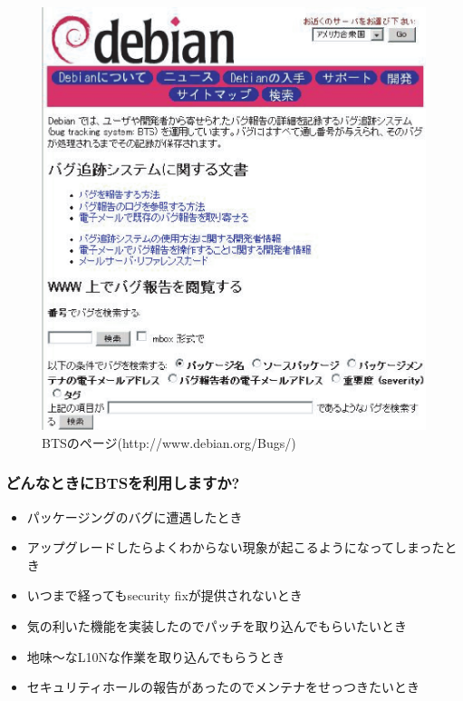 \documentclass[mingoth,a4paper]{jsarticle}
\begin{document}
\begin{figure}[htbp]
\begin{center}
\includegraphics{image200508/bts.eps}
\end{center}
\caption{BTSのページ(http://www.debian.org/Bugs/)}
\label{bts-webpage}
\end{figure}

\subsubsection{どんなときにBTSを利用しますか?}

\begin{itemize}
\item パッケージングのバグに遭遇したとき
\item アップグレードしたらよくわからない現象が起こるようになってしまったとき
\item いつまで経ってもsecurity fixが提供されないとき
\item 気の利いた機能を実装したのでパッチを取り込んでもらいたいとき
\item 地味〜なL10Nな作業を取り込んでもらうとき
\item セキュリティホールの報告があったのでメンテナをせっつきたいとき
\end{itemize}
\end{document}
